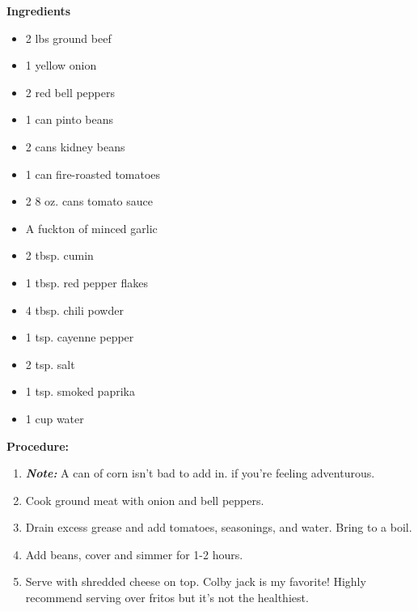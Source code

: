 \begin{multicols}{2}
\textbf{Ingredients}
\begin{itemize}
\item 2 lbs ground beef
\item 1 yellow onion
\item 2 red bell peppers
\item 1 can pinto beans
\item 2 cans kidney beans
\item 1 can fire-roasted tomatoes
\item 2 8 oz. cans tomato sauce
\item A fuckton of minced garlic
\item 2 tbsp. cumin
\item 1 tbsp. red pepper flakes
\item 4 tbsp. chili powder
\item 1 tsp. cayenne pepper
\item 2 tsp. salt
\item 1 tsp. smoked paprika
\item 1 cup water 



\end{itemize}


\columnbreak
\textbf{Procedure:}

\begin{enumerate}
\item \textit{\textbf{Note:}} A can of corn isn't bad to add in. if you're feeling adventurous.
\item Cook ground meat with onion and bell peppers. 

\item Drain excess grease and add tomatoes, seasonings, and water. Bring to a boil. 

\item Add beans, cover and simmer for 1-2 hours. 

\item Serve with shredded cheese on top. Colby jack is my favorite! Highly recommend serving over fritos but it's not the healthiest. 
\end{enumerate}


\end{multicols}
